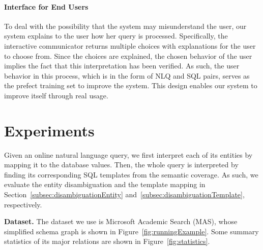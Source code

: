 \documentclass{vldb}
\begin{document}
\paragraph*{Interface for End Users}
To deal with the possibility that the system may misunderstand the user, our system explains to the user how her query is processed.  Specifically, the interactive communicator returns multiple choices with explanations for the user to choose from.  Since the choices are explained, the chosen behavior of the user implies the fact that this interpretation has been verified.  As such, the user behavior in this process, which is in the form of NLQ and SQL pairs, serves as the prefect training set to improve the system.  This design enables our system to improve itself through real usage.  






\section{Experiments}
\label{sec:experiments}
Given an online natural language query, we first interpret each of its entities by mapping it to the database values.  Then, the whole query is interpreted by finding its corresponding SQL templates from the semantic coverage.  As such, we evaluate the entity disambiguation and the template mapping in Section~\ref{subsec:disambiguationEntity} and~\ref{subsec:disambiguationTemplate}, respectively.  

\textbf{Dataset.}
The dataset we use is Microsoft Academic Search (MAS), whose simplified schema graph is shown in Figure~\ref{fig:runningExample}.  Some summary statistics of its major relations are shown in Figure~\ref{fig:statistics}.  
\end{document}
